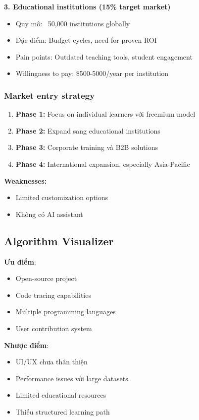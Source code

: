\textbf{3. Educational institutions (15\% target market)}
\begin{itemize}
\item Quy mô: ~50,000 institutions globally
\item Đặc điểm: Budget cycles, need for proven ROI
\item Pain points: Outdated teaching tools, student engagement
\item Willingness to pay: \$500-5000/year per institution
\end{itemize}

\subsubsection{Market entry strategy}

\begin{enumerate}
\item \textbf{Phase 1:} Focus on individual learners với freemium model
\item \textbf{Phase 2:} Expand sang educational institutions
\item \textbf{Phase 3:} Corporate training và B2B solutions
\item \textbf{Phase 4:} International expansion, especially Asia-Pacific
\end{enumerate}

\textbf{Weaknesses:}
\begin{itemize}
\item Limited customization options
\item Không có AI assistant
\end{itemize}

\subsection{Algorithm Visualizer}
\label{subsec:algo-visualizer}

\textbf{Ưu điểm}:
\begin{itemize}
    \item Open-source project
    \item Code tracing capabilities
    \item Multiple programming languages
    \item User contribution system
\end{itemize}

\textbf{Nhược điểm}:
\begin{itemize}
    \item UI/UX chưa thân thiện
    \item Performance issues với large datasets
    \item Limited educational resources
    \item Thiếu structured learning path
\end{itemize}

